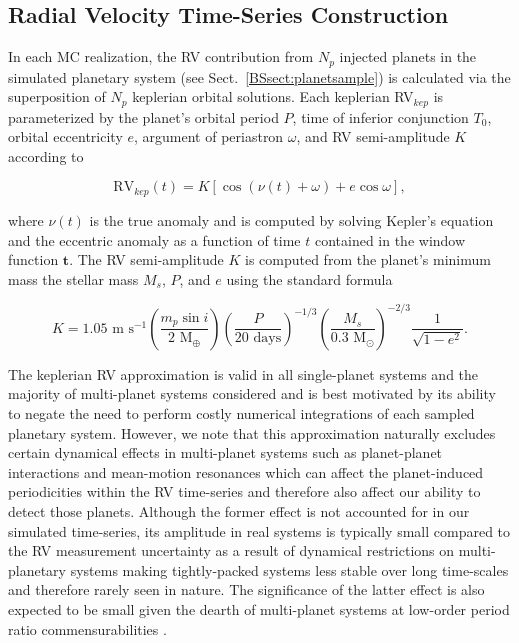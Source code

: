 \subsection{Radial Velocity Time-Series Construction} \label{BSsect:timeseries}
In each MC realization, 
the RV contribution from $N_p$ injected planets in the simulated planetary system (see Sect.~\ref{BSsect:planetsample})
is calculated via the superposition of $N_p$ keplerian orbital solutions. Each keplerian RV$_{kep}$ is parameterized by
the planet's orbital period $P$, time of inferior conjunction $T_0$, orbital eccentricity $e$,
argument of periastron $\omega$, and RV semi-amplitude $K$ according to

\begin{equation}
 \text{RV}_{kep}(t) = K [\cos{(\nu(t) +\omega)} + e \cos{\omega}],
\end{equation}

\noindent where $\nu(t)$ is the true anomaly and is computed by solving Kepler's equation
and the eccentric anomaly as a function of time $t$ contained in the window function
$\mathbf{t}$. The RV semi-amplitude $K$ is computed from the planet's minimum mass
\msini{,} the stellar mass $M_s$, $P$, and $e$ using the standard formula

\begin{equation}
  K = 1.05 \text{ m s}^{-1} \left(\frac{m_p\sin{i}}{2\text{ M}_{\oplus}} \right)
  \left( \frac{P}{20 \text{ days}} \right)^{-1/3} 
  \left( \frac{M_s}{0.3 \text{ M}_{\odot}} \right)^{-2/3}
  \frac{1}{\sqrt{1-e^2}}.
\end{equation}

The keplerian RV approximation
is valid in all single-planet systems and the majority of multi-planet systems considered
and is best motivated by its ability to negate the
need to perform costly numerical integrations of each sampled planetary system. However, we note that
this approximation naturally excludes certain dynamical effects in multi-planet systems such as planet-planet
interactions and mean-motion resonances which can affect the planet-induced periodicities within
the RV time-series and therefore also affect our ability to detect those planets.
Although the former effect is not accounted for in our simulated time-series, its amplitude in real
systems is typically small compared to the RV measurement uncertainty as a result of dynamical restrictions
on multi-planetary systems making tightly-packed systems less stable over long time-scales and therefore
rarely seen in nature.
The significance of the latter effect is also expected to be small given the dearth of 
multi-planet systems at low-order period ratio commensurabilities \citep{lissauer11, fabrycky14}.

